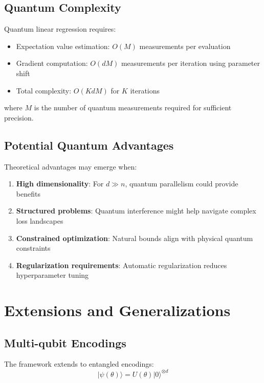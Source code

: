 \documentclass[11pt]{article}
\begin{document}
\subsection{Quantum Complexity}

Quantum linear regression requires:
\begin{itemize}
\item Expectation value estimation: $O(M)$ measurements per evaluation
\item Gradient computation: $O(dM)$ measurements per iteration using parameter shift
\item Total complexity: $O(KdM)$ for $K$ iterations
\end{itemize}

where $M$ is the number of quantum measurements required for sufficient precision.

\subsection{Potential Quantum Advantages}

Theoretical advantages may emerge when:

\begin{enumerate}
\item \textbf{High dimensionality}: For $d \gg n$, quantum parallelism could provide benefits
\item \textbf{Structured problems}: Quantum interference might help navigate complex loss landscapes
\item \textbf{Constrained optimization}: Natural bounds align with physical quantum constraints
\item \textbf{Regularization requirements}: Automatic regularization reduces hyperparameter tuning
\end{enumerate}

\section{Extensions and Generalizations}

\subsection{Multi-qubit Encodings}

The framework extends to entangled encodings:
\begin{equation}
|\psi(\theta)\rangle = U(\theta) |0\rangle^{\otimes d}
\end{equation}
\end{document}
